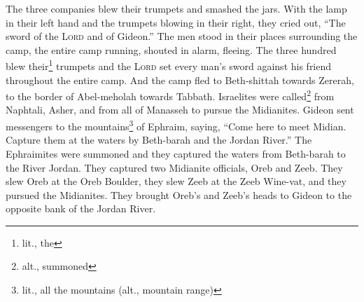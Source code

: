\begin{inparaenum}
     The three companies blew their trumpets and smashed the jars. With the lamp in their left hand and the trumpets blowing in their right, they cried out, ``The sword of the \textsc{Lord} and of Gideon.''%
     The men stood in their places surrounding the camp, the entire camp running, shouted in alarm, fleeing.%
     The three hundred blew their\footnote{lit., the} trumpets and the \textsc{Lord} set every man's sword against his friend throughout the entire camp. And the camp fled to Beth-shittah towards Zererah, to the border of Abel-meholah towards Tabbath.%
     Israelites were called\footnote{alt., summoned} from Naphtali, Asher, and from all of Manasseh to pursue the Midianites.%
     Gideon sent messengers to the mountains\footnote{lit., all the mountains (alt., mountain range)} of Ephraim, saying, ``Come here to meet Midian. Capture them at the waters by Beth-barah and the Jordan River.'' The Ephraimites were summoned and they captured the waters from Beth-barah to the River Jordan.%
     They captured two Midianite officials, Oreb and Zeeb. They slew Oreb at the Oreb Boulder, they slew Zeeb at the Zeeb Wine-vat, and they pursued the Midianites. They brought Oreb's and Zeeb's heads to Gideon to the opposite bank of the Jordan River.%
\end{inparaenum}

